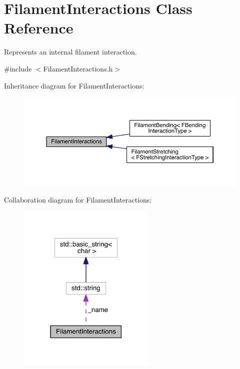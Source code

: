 \hypertarget{classFilamentInteractions}{\section{Filament\+Interactions Class Reference}
\label{classFilamentInteractions}
}


Represents an internal filament interaction.  




{\ttfamily \#include $<$Filament\+Interactions.\+h$>$}



Inheritance diagram for Filament\+Interactions\+:\nopagebreak
\begin{figure}[H]
\begin{center}
\leavevmode
\includegraphics[width=350pt]{classFilamentInteractions__inherit__graph}
\end{center}
\end{figure}


Collaboration diagram for Filament\+Interactions\+:\nopagebreak
\begin{figure}[H]
\begin{center}
\leavevmode
\includegraphics[width=186pt]{classFilamentInteractions__coll__graph}
\end{center}
\end{figure}
